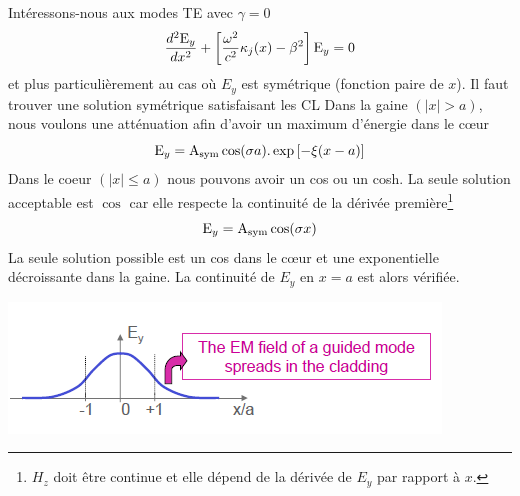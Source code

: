Intéressons-nous aux modes TE avec $\gamma=0$
\begin{equation}
\frac{{{d^2}{{\rm{E}}_y}}}{{d{x^2}}} + \left[ {\frac{{{\omega ^2}}}{{{c^2}}}{\kappa _j}(x) - {\beta ^2}} \right]{{\rm{E}}_y} = 0
\end{equation}
et plus particulièrement au cas où $E_y$ est symétrique (fonction paire de $x$). Il faut trouver une
solution symétrique satisfaisant les CL Dans la gaine $(|x|>a)$, nous voulons une atténuation afin d'avoir un maximum d'énergie dans le cœur
\begin{equation}
{{\rm{E}}_y} = {{\rm{A}}_{{\rm{sym}}}}\cos (\sigma a).\exp \left[ { - \xi (x - a)} \right]
\end{equation}
Dans le coeur $(|x|\leq a)$ nous pouvons avoir un cos ou un cosh. La seule solution acceptable est 
$\cos$ car elle respecte la continuité de la dérivée première\footnote{$H_z$ doit être continue et
elle dépend de la dérivée de $E_y$ par rapport à $x$.}
\begin{equation}
{{\rm{E}}_y} = {{\rm{A}}_{{\rm{sym}}}}\cos (\sigma x)
\end{equation}
La seule solution possible est un cos dans le cœur et une exponentielle décroissante dans la gaine. 
La continuité de $E_y$ en $x=a$ est alors vérifiée. 
\begin{center}
	\includegraphics[scale=0.75]{ch1/image13.png}
\end{center}

